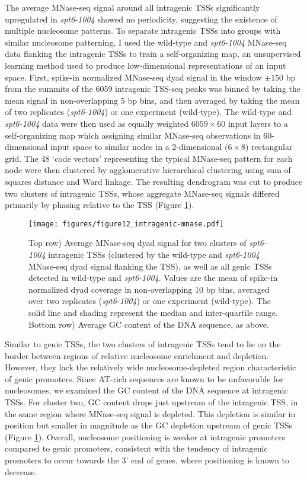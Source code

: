 \documentclass[10pt, letterpaper]{article}
\begin{document}
The average MNase-seq signal around all intragenic TSSs significantly upregulated in \textit{spt6-1004} showed no periodicity, suggesting the existence of multiple nucleosome patterns. To separate intragenic TSSs into groups with similar nucleosome patterning, I used the wild-type and \textit{spt6-1004} MNase-seq data flanking the intragenic TSSs to train a self-organizing map, an unsupervised learning method used to produce low-dimensional representations of an input space. First, spike-in normalized MNase-seq dyad signal in the window $\pm 150$ bp from the summits of the 6059 intragenic TSS-seq peaks was binned by taking the mean signal in non-overlapping 5 bp bins, and then averaged by taking the mean of two replicates (\textit{spt6-1004}) or one experiment (wild-type). The wild-type and \textit{spt6-1004} data were then used as equally weighted $6059 \times 60$ input layers to a self-organizing map which assigning similar MNase-seq observations in 60-dimensional input space to similar nodes in a 2-dimensional ($6 \times 8$) rectangular grid. The 48 `code vectors' representing the typical MNase-seq pattern for each node were then clustered by agglomerative hierarchical clustering using sum of squares distance and Ward linkage. The resulting dendrogram was cut to produce two clusters of intragenic TSSs, whose aggregate MNase-seq signals differed primarily by phasing relative to the TSS (Figure \ref{fig:intra_mnase_metagene}).

\begin{figure}[H]
\centering
\texttt{[image: figures/figure12\_intragenic-mnase.pdf]}
\caption{Top row) Average MNase-seq dyad signal for two clusters of \textit{spt6-1004} intragenic TSSs (clustered by the wild-type and \textit{spt6-1004} MNase-seq dyad signal flanking the TSS), as well as all genic TSSs detected in wild-type and \textit{spt6-1004}. Values are the mean of spike-in normalized dyad coverage in non-overlapping 10 bp bins, averaged over two replicates (\textit{spt6-1004}) or one experiment (wild-type). The solid line and shading represent the median and inter-quartile range. Bottom row) Average GC content of the DNA sequence, as above.}
\label{fig:intra_mnase_metagene}
\end{figure}

Similar to genic TSSs, the two clusters of intragenic TSSs tend to lie on the border between regions of relative nucleosome enrichment and depletion. However, they lack the relatively wide nucleosome-depleted region characteristic of genic promoters. Since AT-rich sequences are known to be unfavorable for nucleosomes, we examined the GC content of the DNA sequence at intragenic TSSs. For cluster two, GC content drops just upstream of the intragenic TSS, in the same region where MNase-seq signal is depleted. This depletion is similar in position but smaller in magnitude as the GC depletion upstream of genic TSSs (Figure \ref{fig:intra_mnase_metagene}). Overall, nucleosome positioning is weaker at intragenic promoters compared to genic promoters, consistent with the tendency of intragenic promoters to occur towards the 3' end of genes, where positioning is known to decrease.
\end{document}
